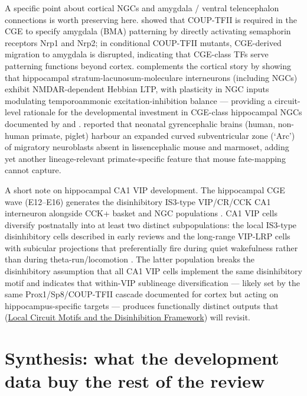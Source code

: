 \documentclass[11pt]{article}
\begin{document}
A specific point about cortical NGCs and amygdala / ventral telencephalon connections is worth preserving here. \citet{Tang2012} showed that COUP-TFII is required in the CGE to specify amygdala (BMA) patterning by directly activating semaphorin receptors Nrp1 and Nrp2; in conditional COUP-TFII mutants, CGE-derived migration to amygdala is disrupted, indicating that CGE-class TFs serve patterning functions beyond cortex. \citet{Mercier2022} complements the cortical story by showing that hippocampal stratum-lacunosum-moleculare interneurons (including NGCs) exhibit NMDAR-dependent Hebbian LTP, with plasticity in NGC inputs modulating temporoammonic excitation-inhibition balance --- providing a circuit-level rationale for the developmental investment in CGE-class hippocampal NGCs documented by \citet{Tricoire2010} and \citet{Tricoire2011}. \citet{Kim2025a} reported that neonatal gyrencephalic brains (human, non-human primate, piglet) harbour an expanded curved subventricular zone (`Arc') of migratory neuroblasts absent in lissencephalic mouse and marmoset, adding yet another lineage-relevant primate-specific feature that mouse fate-mapping cannot capture.

A short note on hippocampal CA1 VIP development. The hippocampal CGE wave (E12--E16) generates the disinhibitory IS3-type VIP/CR/CCK CA1 interneuron alongside CCK+ basket and NGC populations \citep{Tricoire2011, Fuentealba2010}. CA1 VIP cells diversify postnatally into at least two distinct subpopulations: the local IS3-type disinhibitory cells described in early reviews \citep{Rudy2011, Kepecs2014} and the long-range VIP-LRP cells with subicular projections that preferentially fire during quiet wakefulness rather than during theta-run/locomotion \citep{Francavilla2018a}. The latter population breaks the disinhibitory assumption that all CA1 VIP cells implement the same disinhibitory motif and indicates that within-VIP sublineage diversification --- likely set by the same Prox1/Sp8/COUP-TFII cascade documented for cortex but acting on hippocampus-specific targets --- produces functionally distinct outputs that (\href{/disinhibition-framework}{Local Circuit Motifs and the Disinhibition Framework}) will revisit.

\section{Synthesis: what the development data buy the rest of the review}
\end{document}
